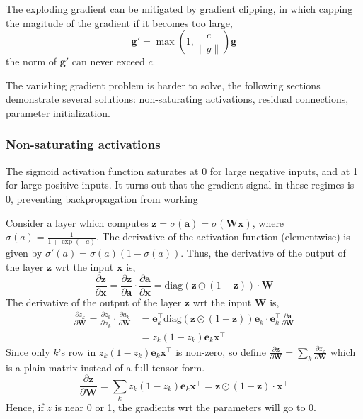 \documentclass[11pt]{article}
\begin{document}
The exploding gradient can be mitigated by gradient clipping, in which capping the magitude of the gradient if it becomes too large,
\[
\boldsymbol{g}' = \max (1, \frac{c}{\| g \|}) \boldsymbol{g}
\]
the norm of $\boldsymbol{g}'$ can never exceed $c$.

The vanishing gradient problem is harder to solve, the following sections demonstrate several solutions: non-saturating activations, residual connections, parameter initialization.

\subsubsection{Non-saturating activations}

The sigmoid activation function saturates at 0 for large negative inputs, and at 1 for large positive inputs. It turns out that the gradient signal in these regimes is 0, preventing backpropagation from working

Consider a layer which computes $\boldsymbol{z} = \sigma(\boldsymbol{a}) = \sigma \left( \mathbf{W} \boldsymbol{x} \right)$, where $\sigma(a) = \frac{1}{1 + \exp(-a)}$.
The derivative of the activation function (elementwise) is given by $\sigma'(a) = \sigma(a)(1 - \sigma(a))$.
Thus, the derivative of the output of the layer $\boldsymbol{z}$ wrt the input $\boldsymbol{x}$ is,
\[
\frac{\partial \boldsymbol{z}}{\partial \boldsymbol{x}} = \frac{\partial \boldsymbol{z}}{\partial \boldsymbol{a}} \cdot \frac{\partial \boldsymbol{a}}{\partial \boldsymbol{x}} = \text{diag}(\boldsymbol{z} \odot (1 - \boldsymbol{z})) \cdot \mathbf{W} 
\]
The derivative of the output of the layer $\boldsymbol{z}$ wrt the input $\mathbf{W}$ is,
\[
\begin{aligned}
\frac{\partial z_k}{\partial \mathbf{W}} = \frac{\partial z_k}{\partial a_k} \cdot \frac{\partial a_k}{\partial \mathbf{W}} &= \boldsymbol{e}_k^\top \text{diag}(\boldsymbol{z} \odot (1 - \boldsymbol{z})) \boldsymbol{e}_k \cdot \boldsymbol{e}_k^\top \frac{\partial \boldsymbol{a}}{\partial \mathbf{W}} \\
&= z_k(1 - z_k) \boldsymbol{e}_k \boldsymbol{x}^\top
\end{aligned}
\]
Since only $k$'s row in $z_k(1 - z_k) \boldsymbol{e}_k \boldsymbol{x}^\top$ is non-zero, so define $\frac{\partial \boldsymbol{z}}{\partial \mathbf{W}} = \sum_k \frac{\partial z_k}{\partial \mathbf{W}}$ which is a plain matrix instead of a full tensor form.
\[
\frac{\partial \boldsymbol{z}}{\partial \mathbf{W}} = \sum_k z_k(1 - z_k) \boldsymbol{e}_k \boldsymbol{x}^\top = \boldsymbol{z} \odot (1 - \boldsymbol{z}) \cdot \boldsymbol{x}^\top 
\]
Hence, if $z$ is near 0 or 1, the gradients wrt the parameters will go to 0.
\end{document}
